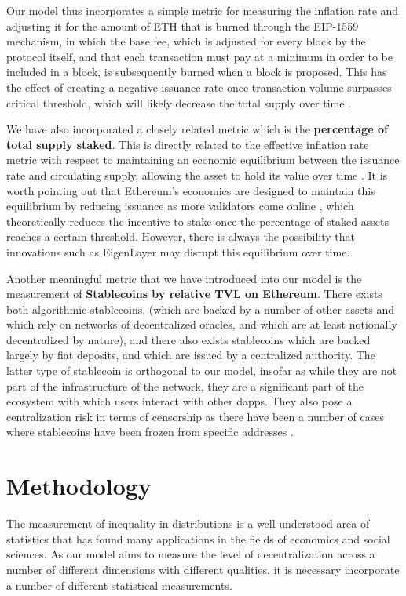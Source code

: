 \documentclass[conference]{IEEEtran}
\begin{document}
Our model thus incorporates a simple metric for measuring the inflation rate and adjusting it for the amount of ETH that is burned through the EIP-1559 mechanism, in which the base fee, which is adjusted for every block by the protocol itself, and that each transaction must pay at a minimum in order to be included in a block, is subsequently burned when a block is proposed.  This has the effect of  creating a negative issuance rate once transaction volume surpasses critical threshold, which will likely decrease the total supply over time \cite{liu2022empirical}.

We have also incorporated a closely related metric which is the \textbf{percentage of total supply staked}.  This is directly related to the effective inflation rate metric with respect to maintaining an economic equilibrium between the issuance rate and circulating supply, allowing the asset to hold its value over time \cite{john2021equilibrium}.  It is worth pointing out that Ethereum's economics are designed to maintain this equilibrium by reducing issuance as more validators come online \cite{edgington2023}, which theoretically reduces the incentive to stake once the percentage of staked assets reaches a certain threshold. However, there is always the possibility that innovations such as EigenLayer may disrupt this equilibrium over time.


Another meaningful metric that we have introduced into our model is the measurement of \textbf{Stablecoins by relative TVL on Ethereum}.  There exists both algorithmic stablecoins, (which are backed by a number of other assets and which rely on networks of decentralized oracles, and which are at least notionally decentralized by nature), and there also exists stablecoins which are backed largely by fiat deposits, and which are issued by a centralized authority.  The latter type of stablecoin is orthogonal to our model, insofar as while they are not part of the infrastructure of the network, they are a significant part of the ecosystem with which users interact with other dapps.  They also pose a centralization risk in terms of censorship as there have been a number of  cases where stablecoins have been frozen from specific addresses \cite{wall2021}.

\section{Methodology}

The measurement of inequality in distributions is a well understood area of statistics that has found many applications in the fields of economics and social sciences. As our model aims to measure the level of decentralization across a number of different dimensions with different qualities, it is necessary incorporate a number of different statistical measurements.
\end{document}
